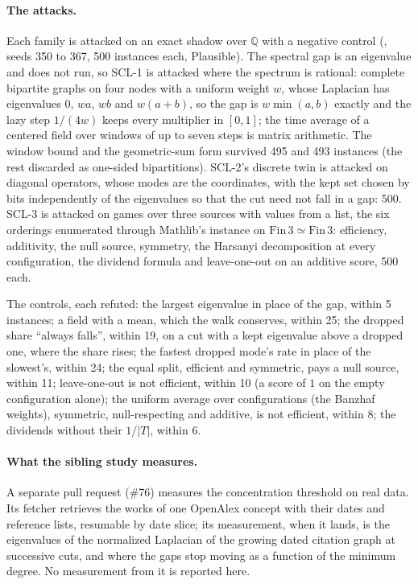 \documentclass[11pt,a4paper]{article}
\theoremstyle{plain}
\theoremstyle{definition}
\theoremstyle{remark}
\newcommand{\abs}[1]{\left\lvert #1 \right\rvert}
\newcommand{\lean}[1]{\path{#1}}
\begin{document}
\paragraph{The attacks.}
Each family is attacked on an exact shadow over $\mathbb{Q}$ with a negative control
(\lean{formal/PalaceTest/Scale.lean}, seeds 350 to 367, 500 instances each, Plausible). The spectral
gap is an eigenvalue and does not run, so SCL-1 is attacked where the spectrum is rational: complete
bipartite graphs on four nodes with a uniform weight $w$, whose Laplacian has eigenvalues $0$, $wa$,
$wb$ and $w(a+b)$, so the gap is $w\min(a,b)$ exactly and the lazy step $1/(4w)$ keeps every
multiplier in $[0,1]$; the time average of a centered field over windows of up to seven steps is
matrix arithmetic. The window bound and the geometric-sum form survived 495 and 493 instances (the
rest discarded as one-sided bipartitions). SCL-2's discrete twin is attacked on diagonal operators,
whose modes are the coordinates, with the kept set chosen by bits independently of the eigenvalues
so that the cut need not fall in a gap: 500. SCL-3 is attacked on games over three sources with
values from a list, the six orderings enumerated through Mathlib's \lean{Fintype} instance on
$\mathrm{Fin}\,3 \simeq \mathrm{Fin}\,3$: efficiency, additivity, the null source, symmetry, the
Harsanyi decomposition at every configuration, the dividend formula and leave-one-out on an additive
score, 500 each.

The controls, each refuted: the largest eigenvalue in place of the gap, within 5 instances; a field
with a mean, which the walk conserves, within 25; the dropped share ``always falls'', within 19, on a
cut with a kept eigenvalue above a dropped one, where the share rises; the fastest dropped mode's rate
in place of the slowest's, within 24; the equal split, efficient and symmetric, pays a null source,
within 11; leave-one-out is not efficient, within 10 (a score of $1$ on the empty configuration
alone); the uniform average over configurations (the Banzhaf weights), symmetric, null-respecting
and additive, is not efficient, within 8; the dividends without their $1/\abs{T}$, within 6.

\paragraph{What the sibling study measures.}
A separate pull request (\#76) measures the concentration threshold on real data. Its
fetcher retrieves the works of one OpenAlex concept \cite{priem2022openalex} with their dates and
reference lists, resumable by date slice; its measurement, when it lands, is the eigenvalues of the
normalized Laplacian of the growing dated citation graph at successive cuts, and where the gaps stop
moving as a function of the minimum degree. No measurement from it is reported here.
\end{document}
